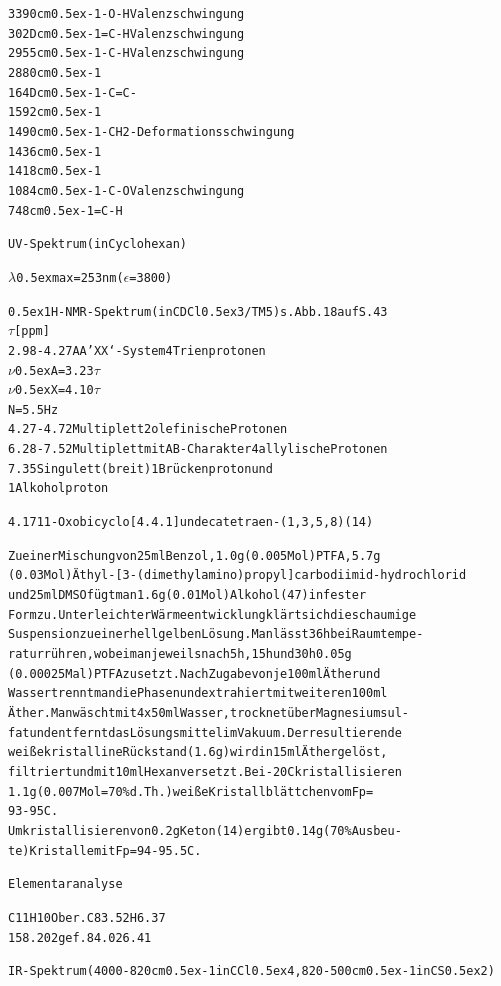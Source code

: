 \documentclass[a4paper,11pt]{article}
\begin{document}
\begin{alltt}

3390 cm\raise0.5ex\hbox{-1} -O-H Valenzschwingung
302D cm\raise0.5ex\hbox{-1} =C-H Valenzschwingung
2955 cm\raise0.5ex\hbox{-1} -C-H Valenzschwingung
2880 cm\raise0.5ex\hbox{-1}
164D cm\raise0.5ex\hbox{-1} -C=C-
1592 cm\raise0.5ex\hbox{-1}
1490 cm\raise0.5ex\hbox{-1} -CH2- Deformationsschwingung
1436 cm\raise0.5ex\hbox{-1}
1418 cm\raise0.5ex\hbox{-1}
1084 cm\raise0.5ex\hbox{-1} -C-O Valenzschwingung
 748 cm\raise0.5ex\hbox{-1} =C-H

\newpage
{}


UV-Spektrum (in Cyclohexan)

\(\lambda\)\lower0.5ex\hbox{max} = 253 nm (\(\epsilon\) = 3800)


\leavevmode\raise0.5ex\hbox{1}H-NMR-Spektrum (in CDCl\lower0.5ex\hbox{3}/TM5) s. Abb. 18 auf S. 43
  \(\tau\) [ppm]
2.98 - 4.27 AA'XX‘-System                4 Trienprotonen
            \(\nu\)\lower0.5ex\hbox{A} = 3.23\(\tau\)
            \(\nu\)\lower0.5ex\hbox{X} = 4.10\(\tau\)
            N = 5.5 Hz
4.27 - 4.72 Multiplett                   2 olefinische Protonen
6.28 - 7.52 Multiplett mit AB-Charakter  4 allylische Protonen
7.35 Singulett (breit)                   1 Brückenproton und
                                         1 Alkoholproton

4.17 11-Oxobicyclo[4.4.1]undecatetraen-(1‚3,5,8) (14)

Zu einer Mischung von 25 ml Benzol, 1.0 g (0.005 Mol) PTFA, 5.7 g
(0.03 Mol) Äthyl-[3-(dimethylamino)propyl]carbodiimid-hydrochlorid
und 25 ml DMSO fügt man 1.6 g (0.01 Mol) Alkohol (47) in fester
Form zu. Unter leichter Wärmeentwicklung klärt sich die schaumige
Suspension zu einer hellgelben Lösung. Man lässt 36 h bei Raumtempe-
ratur rühren, wobei man jeweils nach 5 h, 15 h und 30 h 0.05 g
(0.00025 Mal) PTFA zusetzt. Nach Zugabe von je 100 ml Äther und
Wasser trennt man die Phasen und extrahiert mit weiteren 100 ml
Äther. Man wäscht mit 4 x 50 ml Wasser, trocknet über Magnesiumsul-
fat und entfernt das Lösungsmittel im Vakuum. Der resultierende
weiße kristalline Rückstand (1.6 g) wird in 15 ml Äther gelöst,
filtriert und mit 10 ml Hexan versetzt. Bei -20\degree{}C kristallisieren
1.1 g (0.007 Mol = 70 \% d.Th.) weiße Kristallblättchen vom Fp =
93 - 95\degree{}C.
Umkristallisieren von 0.2 g Keton (14) ergibt 0.14 g (70 \% Ausbeu-
te) Kristalle mit Fp = 94 - 95.5\degree{}C.

\newpage
{}


Elementaranalyse

C11H10O   ber. C  83.52    H  6.37
158.202   gef.    84.02       6.41

IR-Spektrum (4000-820 cm\raise0.5ex\hbox{-1} in CCl\lower0.5ex\hbox{4}, 820-500 cm\raise0.5ex\hbox{-1} in CS\lower0.5ex\hbox{2})
\end{alltt}
\end{document}
